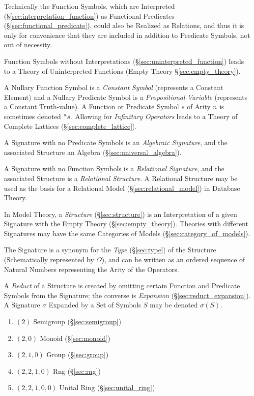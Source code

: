 Technically the Function Symbols, which are Interpreted
(\S\ref{sec:interpretation_function}) as Functional Predicates
(\S\ref{sec:functional_predicate}), could also be Realized as
Relations, and thus it is only for convenience that they are included
in addition to Predicate Symbols, not out of necessity.

Function Symbols without Interpretations
(\S\ref{sec:uninterpreted_function}) leads to a Theory of
Uninterpreted Functions (Empty Theory \S\ref{sec:empty_theory}).

A Nullary Function Symbol is a \emph{Constant Symbol} (represents a
Constant Element) and a Nullary Predicate Symbol is a
\emph{Propositional Variable} (represents a Constant Truth-value). A
Function or Predicate Symbol $s$ of Arity $n$ is sometimes denoted
$\prescript{n}{}{s}$. Allowing for \emph{Infinitary Operators} leads
to a Theory of Complete Lattices (\S\ref{sec:complete_lattice}).

A Signature with no Predicate Symbols is an \emph{Algebraic
  Signature}, and the associated Structure an Algebra
(\S\ref{sec:universal_algebra}).

A Signature with no Function Symbols is a \emph{Relational Signature},
and the associated Structure is a \emph{Relational Structure}. A
Relational Structure may be used as the basis for a Relational Model
(\S\ref{sec:relational_model}) in Database Theory.

In Model Theory, a \emph{Structure} (\S\ref{sec:structure}) is an
Interpretation of a given Signature with the Empty Theory
(\S\ref{sec:empty_theory}). Theories with different Signatures may
have the same Categories of Models (\S\ref{sec:category_of_models}).

The Signature is a synonym for the \emph{Type} (\S\ref{sec:type}) of
the Structure (Schematically represented by $\Omega$), and can be
written as an ordered sequence of Natural Numbers representing the
Arity of the Operators.

A \emph{Reduct} of a Structure is created by omitting certain Function
and Predicate Symbols from the Signature; the converse is
\emph{Expansion} (\S\ref{sec:reduct_expansion}). A Signature $\sigma$
Expanded by a Set of Symbols $S$ may be denoted $\sigma(S)$.

\begin{enumerate}
  \item $(2)$         Semigroup (\S\ref{sec:semigroup})
  \item $(2,0)$       Monoid (\S\ref{sec:monoid})
  \item $(2,1,0)$     Group (\S\ref{sec:group})
  \item $(2,2,1,0)$   Rng (\S\ref{sec:rng})
  \item $(2,2,1,0,0)$ Unital Ring (\S\ref{sec:unital_ring})
\end{enumerate}



